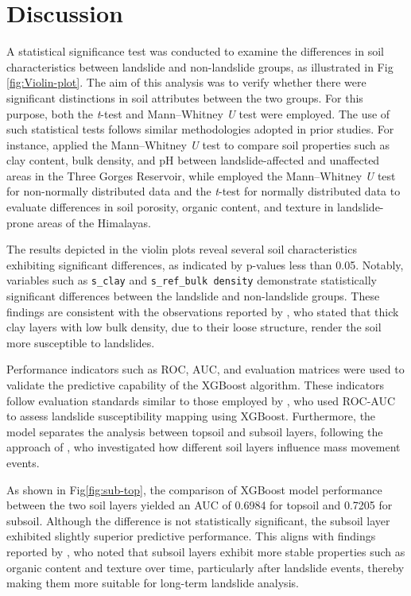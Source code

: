 \section{Discussion}

A statistical significance test was conducted to examine the differences in soil characteristics between landslide and non-landslide groups, as illustrated in Fig \ref{fig:Violin-plot}. The aim of this analysis was to verify whether there were significant distinctions in soil attributes between the two groups. For this purpose, both the \textit{t}-test and Mann–Whitney \textit{U} test were employed. The use of such statistical tests follows similar methodologies adopted in prior studies. For instance, \cite{disc01} applied the Mann–Whitney \textit{U} test to compare soil properties such as clay content, bulk density, and pH between landslide-affected and unaffected areas in the Three Gorges Reservoir, while \cite{disc02} employed the Mann–Whitney \textit{U} test for non-normally distributed data and the \textit{t}-test for normally distributed data to evaluate differences in soil porosity, organic content, and texture in landslide-prone areas of the Himalayas.

The results depicted in the violin plots reveal several soil characteristics exhibiting significant differences, as indicated by p-values less than 0.05. Notably, variables such as \texttt{s\_clay} and \texttt{s\_ref\_bulk density} demonstrate statistically significant differences between the landslide and non-landslide groups. These findings are consistent with the observations reported by \cite{disc03}, who stated that thick clay layers with low bulk density, due to their loose structure, render the soil more susceptible to landslides.

Performance indicators such as ROC, AUC, and evaluation matrices were used to validate the predictive capability of the XGBoost algorithm. These indicators follow evaluation standards similar to those employed by \cite{disc04}, who used ROC-AUC to assess landslide susceptibility mapping using XGBoost. Furthermore, the model separates the analysis between topsoil and subsoil layers, following the approach of \cite{disc05}, who investigated how different soil layers influence mass movement events.

As shown in Fig\ref{fig:sub-top}, the comparison of XGBoost model performance between the two soil layers yielded an AUC of 0.6984 for topsoil and 0.7205 for subsoil. Although the difference is not statistically significant, the subsoil layer exhibited slightly superior predictive performance. This aligns with findings reported by \cite{disc06}, who noted that subsoil layers exhibit more stable properties such as organic content and texture over time, particularly after landslide events, thereby making them more suitable for long-term landslide analysis.

